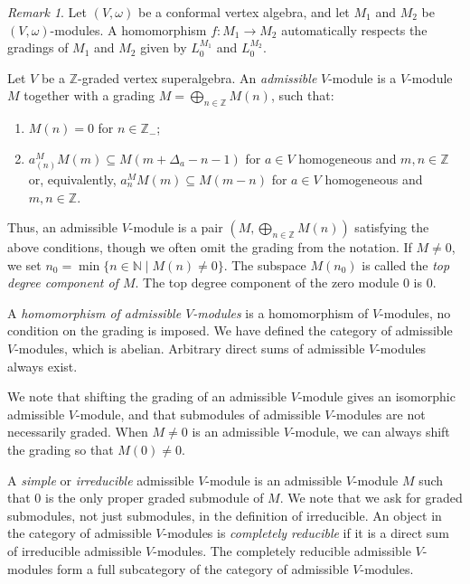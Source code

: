 \documentclass[a4paper, 12pt, reqno]{amsart}
\theoremstyle{remark}
\newtheorem{remark}[theorem]{Remark}
\begin{document}
\begin{remark}
  \label{rmk:25}
  Let $(V, \omega)$ be a conformal vertex algebra, and let $M_1$ and $M_2$ be $(V, \omega)$-modules.
  A homomorphism $f: M_1 \to M_2$ automatically respects the gradings of $M_1$ and $M_2$ given by $L_0^{M_1}$ and $L_0^{M_2}$.
\end{remark}

Let $V$ be a $\mathbb{Z}$-graded vertex superalgebra.
An \emph{admissible} $V$-module is a $V$-module $M$ together with a grading $M = \bigoplus_{n \in \mathbb{Z}}M(n)$, such that:
\begin{enumerate}
\item $M(n) = 0$ for $n \in \mathbb{Z}_-$;
\item $a^M_{(n)}M(m) \subseteq M(m + \Delta_a - n - 1)$ for $a \in V$ homogeneous and $m, n \in \mathbb{Z}$ or, equivalently, $a^M_nM(m) \subseteq M(m - n)$ for $a \in V$ homogeneous and $m, n \in \mathbb{Z}$.
\end{enumerate}

Thus, an admissible $V$-module is a pair $(M, \bigoplus_{n \in \mathbb{Z}}M(n))$ satisfying the above conditions, though we often omit the grading from the notation.
If $M \neq 0$, we set $n_0 = \min\{n \in \mathbb{N} \mid M(n) \neq 0\}$.
The subspace $M(n_0)$ is called the \emph{top degree component of $M$}.
The top degree component of the zero module $0$ is $0$.

A \emph{homomorphism of admissible $V$-modules} is a homomorphism of $V$-modules, no condition on the grading is imposed.
We have defined the category of admissible $V$-modules, which is abelian.
Arbitrary direct sums of admissible $V$-modules always exist.

We note that shifting the grading of an admissible $V$-module gives an isomorphic admissible $V$-module, and that submodules of admissible $V$-modules are not necessarily graded.
When $M \neq 0$ is an admissible $V$-module, we can always shift the grading so that $M(0) \neq 0$.

A \emph{simple} or \emph{irreducible} admissible $V$-module is an admissible $V$-module $M$ such that $0$ is the only proper graded submodule of $M$.
We note that we ask for graded submodules, not just submodules, in the definition of irreducible.
An object in the category of admissible $V$-modules is \emph{completely reducible} if it is a direct sum of irreducible admissible $V$-modules.
The completely reducible admissible $V$-modules form a full subcategory of the category of admissible $V$-modules.
\end{document}
